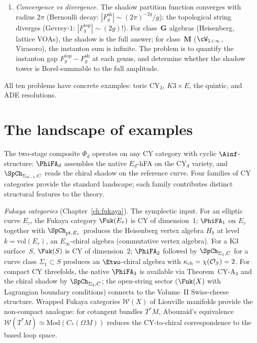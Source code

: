 \begin{enumerate}[label=\textup{(\roman*)}]
 non-HK CY-$4$) are outside scope.
\item \emph{Convergence vs divergence.}
 The shadow partition function converges with radius $2\pi$
 (Bernoulli decay: $|F_g^{\mathrm{sh}}| \sim (2\pi)^{-2g}/g$);
 the topological string diverges
 (Gevrey-$1$: $|F_g^{\mathrm{top}}| \sim (2g)!$). For
 class~$\mathbf{G}$ algebras (Heisenberg, lattice VOAs), the
 shadow is the full answer; for class~$\mathbf{M}$
 ($\cW_{1+\infty}$, Virasoro), the instanton sum is infinite.
 The problem is to quantify the instanton gap
 $F_g^{\mathrm{top}} - F_g^{\mathrm{sh}}$ at each genus, and
 determine whether the shadow tower is Borel-summable to the
 full amplitude.
\end{enumerate}

All ten problems have concrete examples: toric CY$_3$, \(K3\times E\),
the quintic, and ADE resolutions.

\section{The landscape of examples}
\label{sec:landscape-examples}

The two-stage composite $\Phi_d$ operates on any CY category
with cyclic $\Ainf$-structure: $\PhiFA_d$ assembles the
native $E_d$-hFA on the CY$_d$ variety, and
$\SpCh_{\Sigma_{d-1}, C}$ reads the chiral shadow on the
reference curve. Four families of CY categories provide the
standard landscape; each family contributes distinct
structural features to the theory.

\emph{Fukaya categories} (Chapter~\ref{ch:fukaya}). The
symplectic input. For an elliptic curve $E_\tau$, the Fukaya
category $\Fuk(E_\tau)$ is CY of dimension~$1$; $\PhiFA_1$
on $E_\tau$ together with $\SpCh_{\mathrm{pt}, E_\tau}$
produces the Heisenberg vertex algebra $H_k$ at level
$k = \mathrm{vol}(E_\tau)$, an $E_\infty$-chiral algebra
(commutative vertex algebra). For a K3 surface~$S$, $\Fuk(S)$
is CY of dimension~$2$; $\PhiFA_2$ followed by
$\SpCh_{\Sigma_1, C}$ for a curve class $\Sigma_1 \subset S$
produces an $\Etwo$-chiral algebra with
$\kappa_{\mathrm{ch}} = \chi(\mathcal{O}_S) = 2$. For compact CY
threefolds, the native $\PhiFA_3$ is available via
Theorem~CY-A$_3$ and the chiral shadow by $\SpCh_{\Sigma_2,
C}$; the open-string sector ($\Fuk(X)$ with Lagrangian
boundary conditions) connects to the Volume~II Swiss-cheese
structure. Wrapped Fukaya categories
$\mathcal{W}(X)$ of Liouville manifolds provide the
non-compact analogue: for cotangent bundles $T^*M$, Abouzaid's
equivalence
$\mathcal{W}(T^*M) \simeq \mathrm{Mod}(C_*(\Omega M))$
reduces the CY-to-chiral correspondence to the based loop space.


